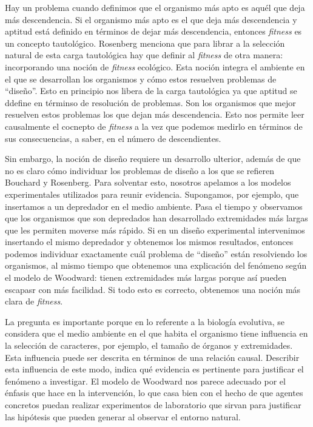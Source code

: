 Hay un problema cuando definimos que el organismo más apto es aquél que deja más descendencia. Si el organismo más apto es el que deja más descendencia y aptitud está definido en términos de dejar más descendencia, entonces \emph{fitness} es un concepto tautológico. Rosenberg menciona que para librar a la selección natural de esta carga tautológica hay que definir al \emph{fitness} de otra manera: incorporando una noción de \emph{fitness} ecológico. Esta noción integra el ambiente en el que se desarrollan los organismos y cómo estos resuelven problemas de ``diseño''. Esto en principio nos libera de la carga tautológica ya que aptitud se ddefine en términso de resolución de problemas. Son los organismos que mejor resuelven estos problemas los que dejan más descendencia. Esto nos permite leer causalmente el cocnepto de \emph{fitness} a la vez que podemos medirlo en términos de sus consecuencias, a saber, en el número de descendientes.

Sin embargo, la noción de diseño requiere un desarrollo ulterior, además de que no es claro cómo individuar los problemas de diseño a los que se refieren Bouchard y Rosenberg. Para solventar esto, nosotros apelamos a los modelos experimentales utilizados para reunir evidencia. Supongamos, por ejemplo, que insertamos a un depredador en el medio ambiente. Pasa el tiempo y observamos que los organismos que son depredados han desarrollado extremidades más largas que les permiten moverse más rápido. Si en un diseño experimental intervenimos insertando el mismo depredador y obtenemos los mismos resultados, entonces podemos individuar exactamente cuál problema de ``diseño'' están resolviendo los organismos, al mismo tiempo que obtenemos una explicación del fenómeno según el modelo de Woodward: tienen extremidades más largas porque así pueden escapasr con más facilidad. Si todo esto es correcto, obtenemos una noción más clara de \emph{fitness}.

La pregunta es importante porque en lo referente a la biología evolutiva, se considera que el medio ambiente en el que habita el organismo tiene influencia en la selección de caracteres, por ejemplo, el tamaño de órganos y extremidades. Esta influencia puede ser descrita en términos de una relación causal. Describir esta influencia de este modo, indica qué evidencia es pertinente para justificar el fenómeno a investigar. El modelo de Woodward nos parece adecuado por el énfasis que hace en la intervención, lo que casa bien con el hecho de que agentes concretos puedan realizar experimentos de laboratorio que sirvan para justificar las hipótesis que pueden generar al observar el entorno natural.



